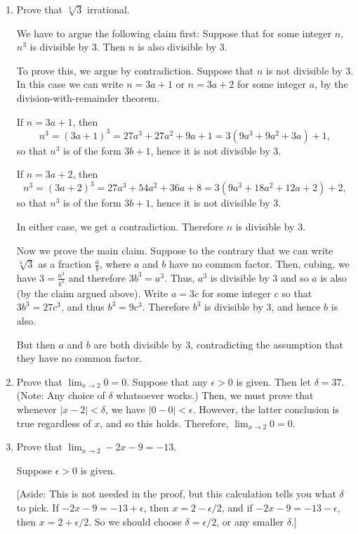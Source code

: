 \documentclass[12pt]{amsart}
\begin{document}
\begin{enumerate}[1.]
\item Prove that $\sqrt[3]{3}$ irrational.

We have to argue the following claim first: Suppose that for some integer $n$, $n^3$ is divisible
by 3. Then $n$ is also divisible by 3.

To prove this, we argue by contradiction. Suppose that $n$ is not divisible by 3. In this case
we can write $n = 3a + 1$ or $n = 3a + 2$ for some integer $a$, by the division-with-remainder theorem.

If $n = 3a + 1$, then $$n^3 = (3a + 1)^3 = 27a^3 + 27a^2 + 9a + 1 = 3(9a^3 + 9a^2 + 3a) + 1,$$
so that $n^3$ is of the form $3b + 1$, hence it is not divisible by 3.

If $n = 3a + 2$, then $$n^3 = (3a + 2)^3 = 27a^3 + 54a^2 + 36a + 8 = 3(9a^3 + 18a^2 + 12a + 2) + 2,$$
so that $n^3$ is of the form $3b + 1$, hence it is not divisible by 3.

In either case, we get a contradiction. Therefore $n$ is divisible by 3.

Now we prove the main claim. Suppose to the contrary that we can write $\sqrt[3]{3}$ as a fraction $\frac{a}{b}$,
where $a$ and $b$ have no common factor. Then, cubing, we have $3 = \frac{a^3}{b^3}$ and therefore $3 b^3 = a^3$.
Thus, $a^3$ is divisible by 3 and so $a$ is also (by the claim argued above). Write $a = 3c$ for some integer $c$
so that $3 b^3 = 27 c^3$, and thus $b^3 = 9 c^3$. Therefore $b^3$ is divisible by 3, and hence $b$ is also.

But then $a$ and $b$ are both divisible by 3, contradicting the assumption that they have no common factor.

\item Prove that $\lim_{x \rightarrow 2} 0 = 0$.
Suppose that any $\epsilon > 0$ is given. Then let $\delta = 37.$ (Note: Any choice of $\delta$ whatsoever 
works.) Then, we must prove that whenever $|x - 2| < \delta$, we have $|0 - 0| < \epsilon$. However, the latter conclusion is true
regardless of $x$, and so this holds. Therefore, $\lim_{x \rightarrow 2} 0 = 0$.

\item Prove that $\lim_{x \rightarrow 2} -2x - 9 = -13.$

Suppose $\epsilon > 0$ is given.

[Aside: This is not needed in the proof, but this calculation tells you what $\delta$ to pick.
If $-2x - 9 = -13 + \epsilon$, then $x = 2 - \epsilon/2$, and if $-2x - 9 = -13 - \epsilon$,
then $x = 2 + \epsilon/2$. So we should choose $\delta = \epsilon/2$, or any smaller $\delta$.]


\end{enumerate}
\end{document}
